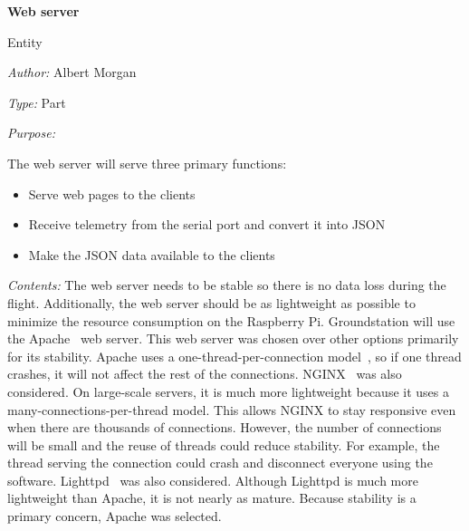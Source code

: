 \documentclass[10pt,draftclsnofoot,onecolumn]{IEEEtran}
\newcommand{\newentity}[5]{

	\noindent\textbf{#2}
	
	\noindent Entity
	
	\noindent\textit{Author:} {#1}
		
	\noindent\textit{Type:} {#3}
	
	\noindent\textit{Purpose:} {#4}

	\noindent\textit{Contents:} {#5}
	\vspace{.5cm}

}
\begin{document}
	\newentity
	{Albert Morgan}
	{Web server}
	{Part}
	{	The web server will serve three primary functions:
		\begin{itemize}
		\item Serve web pages to the clients
		\item Receive telemetry from the serial port and convert it into JSON
		\item Make the JSON data available to the clients
		\end{itemize}
	}
	{
		The web server needs to be stable so there is no data loss during the flight.
		Additionally, the web server should be as lightweight as possible to minimize the resource consumption on the Raspberry Pi.
		Groundstation will use the Apache~\cite{apache} web server.
		This web server was chosen over other options primarily for its stability.
		Apache uses a one-thread-per-connection model~\cite{nginx-vs-apache-our-view}, so if one thread crashes, it will not affect the rest of the connections.
		NGINX~\cite{nginx} was also considered. On large-scale servers, it is much more lightweight because it uses a many-connections-per-thread
		model.
		This allows NGINX to stay responsive even when there are thousands of connections.
		However, the number of connections will be small and the reuse of threads could reduce stability.
		For example, the thread serving the connection could crash and disconnect everyone using the software.
		Lighttpd~\cite{lighttpd} was also considered. Although Lighttpd is much more lightweight than Apache,
		it is not nearly as mature.
		Because stability is a primary concern, Apache was selected.
	}
\end{document}
